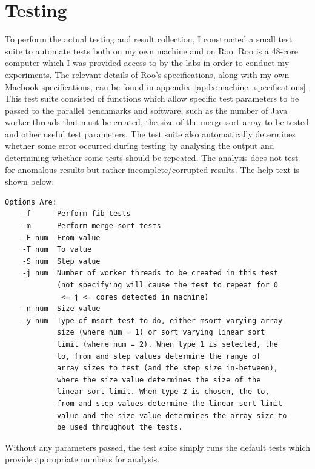 \documentclass[12pt,twoside,notitlepage]{report}
\begin{document}
\section{Testing}
\label{sec:testing}
To perform the actual testing and result collection, I constructed a small test suite to automate tests both on my own machine and on Roo. Roo is a 48-core computer which I was provided access to by the labs in order to conduct my
experiments. The relevant details of Roo's specifications, along with my own Macbook specifications, can be found in appendix~\ref{apdx:machine_specifications}. This test suite consisted of functions which allow specific test parameters to be passed to the
parallel benchmarks and software, such as the number of Java worker threads that must be created, the size of the merge sort array to be tested and other useful test parameters. The test suite also automatically determines whether
some error occurred during testing by analysing the output and determining whether some tests should be repeated. The analysis does not test for anomalous results but rather incomplete/corrupted results. The help text is shown below:
\begin{lstlisting}[keywordstyle=\color{black}]
Options Are:
    -f      Perform fib tests
    -m      Perform merge sort tests
    -F num  From value
    -T num  To value
    -S num  Step value
    -j num  Number of worker threads to be created in this test 
            (not specifying will cause the test to repeat for 0
             <= j <= cores detected in machine)
    -n num  Size value
    -y num  Type of msort test to do, either msort varying array 
            size (where num = 1) or sort varying linear sort 
            limit (where num = 2). When type 1 is selected, the
            to, from and step values determine the range of 
            array sizes to test (and the step size in-between), 
            where the size value determines the size of the 
            linear sort limit. When type 2 is chosen, the to, 
            from and step values determine the linear sort limit 
            value and the size value determines the array size to 
            be used throughout the tests.
\end{lstlisting}
Without any parameters passed, the test suite simply runs the default tests which provide appropriate numbers for analysis.
\end{document}
